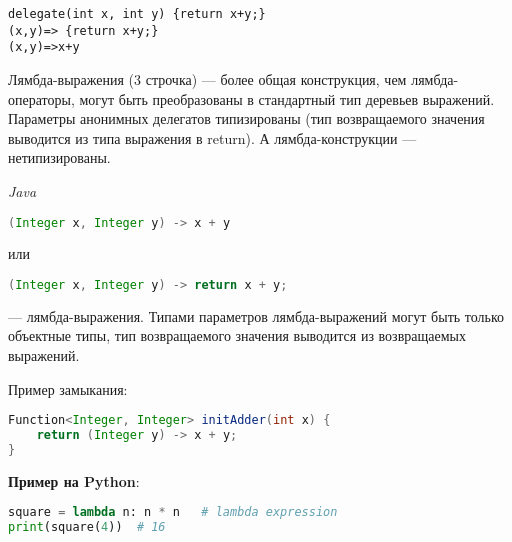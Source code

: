 \begin{lstlisting}
delegate(int x, int y) {return x+y;}
(x,y)=> {return x+y;}
(x,y)=>x+y
\end{lstlisting}

Лямбда-выражения (3 строчка) --- более общая конструкция, чем лямбда-операторы, могут быть преобразованы в стандартный тип деревьев выражений. 
Параметры анонимных делегатов типизированы (тип возвращаемого значения выводится из типа выражения в return). 
А лямбда-конструкции --- нетипизированы.

\textit{Java}

\begin{lstlisting}[language=Java]
(Integer x, Integer y) -> x + y 
\end{lstlisting}
или
\begin{lstlisting}[language=Java]
(Integer x, Integer y) -> return x + y; 
\end{lstlisting}
--- лямбда-выражения. 
Типами параметров лямбда-выражений могут быть только объектные типы, тип возвращаемого значения выводится из возвращаемых выражений.

Пример замыкания:

\begin{lstlisting}[language=Java]
Function<Integer, Integer> initAdder(int x) {
    return (Integer y) -> x + y;
}
\end{lstlisting}

\textbf{Пример на Python}:

\begin{lstlisting}[language=Python]
square = lambda n: n * n   # lambda expression
print(square(4))  # 16
\end{lstlisting}

